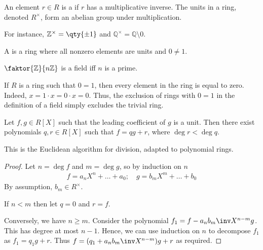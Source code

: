 \begin{definition}[Unit]
	An element $r \in R$ is a  if $r$ has a multiplicative inverse.
	The units in a ring, denoted $R^\times$, form an abelian group under multiplication.
\end{definition}

For instance, $\mathbb Z^\times = \qty{\pm 1}$ and $\mathbb Q^\times = \mathbb Q \setminus \qty{0}$.

\begin{definition}[Field]
	A  is a ring where all nonzero elements are units and $0 \neq 1$.
\end{definition}

\begin{example}
	$\faktor{\mathbb Z}{n\mathbb Z}$ is a field iff $n$ is a prime.
\end{example}

\begin{remark}
	If $R$ is a ring such that $0 = 1$, then every element in the ring is equal to zero.
	Indeed, $x = 1\cdot x = 0\cdot x = 0$.
	Thus, the exclusion of rings with $0 = 1$ in the definition of a field simply excludes the trivial ring.
\end{remark}

\begin{proposition} \label{prp:7.1}
	Let $f, g \in R[X]$ such that the leading coefficient of $g$ is a unit.
	Then there exist polynomials $q, r \in R[X]$ such that $f = qg + r$, where $\deg r < \deg q$.
\end{proposition}

\begin{remark}
	This is the Euclidean algorithm for division, adapted to polynomial rings.
\end{remark}

\begin{proof}
	Let $n = \deg f$ and $m = \deg g$, so by induction on $n$
	\begin{align*}
		f = a_n X^n + \dots + a_0;\quad g = b_m X^m + \dots + b_0
	\end{align*}
	By assumption, $b_m \in R^\times$.

	If $n < m$ then let $q = 0$ and $r = f$.

	Conversely, we have $n \geq m$.
	Consider the polynomial $f_1 = f - a_n b_m\inv X^{n-m} g$.
	This has degree at most $n - 1$.
	Hence, we can use induction on $n$ to decompose $f_1$ as $f_1 = q_1 g + r$.
	Thus $f = (q_1 + a_n b_m\inv X^{n-m}) g + r$ as required.
\end{proof}

